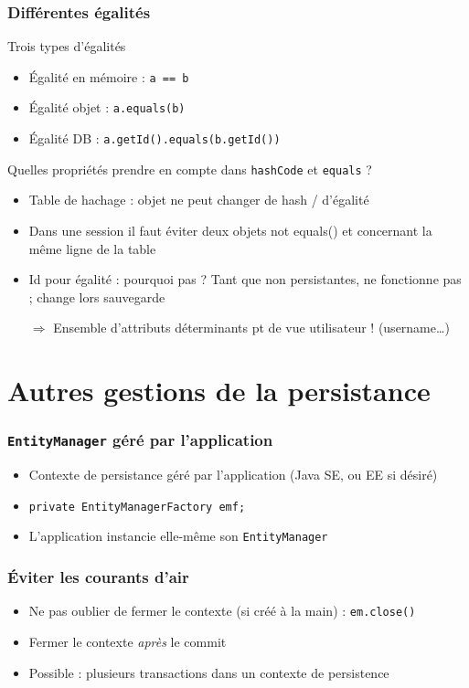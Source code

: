 \documentclass[french, english]{beamer}
\begin{document}
\begin{frame}
	\frametitle{Différentes égalités}
	\begin{block}{Trois types d’égalités}
		\begin{itemize}
			\item Égalité en mémoire : \texttt{a == b}
			\item Égalité objet : \texttt{a.equals(b)}
			\item Égalité DB : \texttt{a.getId().equals(b.getId())}
		\end{itemize}
	\end{block}
	Quelles propriétés prendre en compte dans \texttt{hashCode} et \texttt{equals} ?
	\begin{itemize}
		\item Table de hachage : objet ne peut changer de hash / d’égalité
		\item Dans une session il faut éviter deux objets not equals() et concernant la même ligne de la table
		\item Id pour égalité : pourquoi pas ? \pause Tant que non persistantes, ne fonctionne pas ; change lors sauvegarde \pause
		\item[$⇒$] Ensemble d’attributs déterminants pt de vue utilisateur ! (username…)
	\end{itemize}
\end{frame}

\section{Autres gestions de la persistance}
\begin{frame}
	\frametitle{\texttt{EntityManager} géré par l’application}
	\begin{itemize}
		\item Contexte de persistance géré par l’application (Java SE, ou EE si désiré)
		\item {} \texttt{private EntityManagerFactory emf;}
		\item L’application instancie elle-même son \texttt{EntityManager}
	\end{itemize}
\end{frame}

\begin{frame}
	\frametitle{Éviter les courants d’air}
	\begin{itemize}
		\item Ne pas oublier de fermer le contexte (si créé à la main) : \texttt{em.close()}
		\item Fermer le contexte \emph{après} le commit
		\item Possible : plusieurs transactions dans un contexte de persistence
	\end{itemize}
\end{frame}
\end{document}
